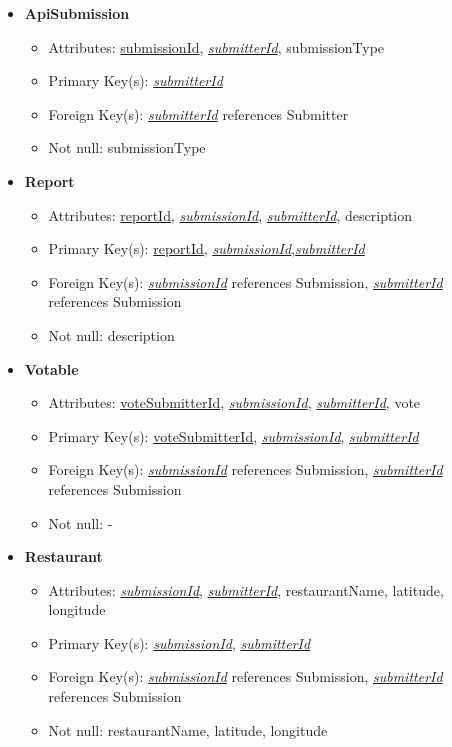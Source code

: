 \documentclass{article}
\begin{document}
\begin{itemize}
        \item \textbf{ApiSubmission}
        \begin{itemize}
            \item Attributes: \underline{submissionId}, \underline{\textit{submitterId}}, submissionType
            \item Primary Key(s): \underline{\textit{submitterId}}
            \item Foreign Key(s): \underline{\textit{submitterId}} references Submitter
            \item Not null: submissionType
        \end{itemize}

        \item \textbf{Report}
        \begin{itemize}
            \item Attributes: \underline{reportId}, \underline{\textit{submissionId}}, \underline{\textit{submitterId}}, description
            \item Primary Key(s): \underline{reportId}, \underline{\textit{submissionId}},\underline{\textit{submitterId}}
            \item Foreign Key(s): \underline{\textit{submissionId}} references Submission, \underline{\textit{submitterId}} references Submission
            \item Not null: description
        \end{itemize}

        \item \textbf{Votable}
        \begin{itemize}
            \item Attributes: \underline{voteSubmitterId}, \underline{\textit{submissionId}}, \underline{\textit{submitterId}}, vote
            \item Primary Key(s): \underline{voteSubmitterId}, \underline{\textit{submissionId}}, \underline{\textit{submitterId}}
            \item Foreign Key(s): \underline{\textit{submissionId}} references Submission, \underline{\textit{submitterId}} references Submission
            \item Not null: -
        \end{itemize}

        \item \textbf{Restaurant}
        \begin{itemize}
            \item Attributes: \underline{\textit{submissionId}}, \underline{\textit{submitterId}}, restaurantName, latitude, longitude
            \item Primary Key(s): \underline{\textit{submissionId}}, \underline{\textit{submitterId}}
            \item Foreign Key(s): \underline{\textit{submissionId}} references Submission, \underline{\textit{submitterId}} references Submission
            \item Not null: restaurantName, latitude, longitude
        \end{itemize}
    

\end{itemize}
\end{document}

